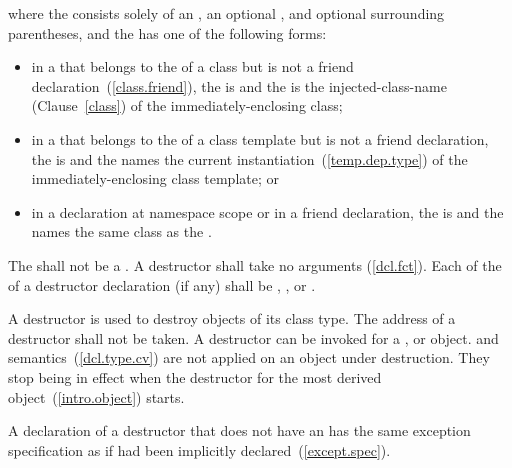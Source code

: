 where the  consists solely of an
, an optional ,
and optional surrounding parentheses, and the  has
one of the following forms:

\begin{itemize}
\item
in a  that belongs to the
 of a class but is not a friend
declaration~(\ref{class.friend}), the  is
\tcode{\~} and the  is the
injected-class-name (Clause~\ref{class}) of the immediately-enclosing class;

\item
in a  that belongs to the
 of a class template but is not a friend
declaration, the  is
\tcode{\~} and the  names the
current instantiation~(\ref{temp.dep.type}) of the immediately-enclosing class template; or

\item
in a declaration at namespace scope or in a friend declaration, the
 is 
\tcode{\~} and the  names the
same class as the .
\end{itemize}

The  shall not be a . A
destructor shall take no arguments (\ref{dcl.fct}).
Each  of the 
of a destructor declaration (if any) shall be , , or
.

\pnum
A destructor is used to destroy objects of its class type.
%
The address of a destructor shall not be taken.
%
%
A destructor can be invoked for a
,
or
object.
and
semantics~(\ref{dcl.type.cv}) are not applied on an object under destruction.
They stop being in effect when the destructor for the
most derived object~(\ref{intro.object}) starts.

\pnum
A declaration of a destructor that does not have an 
has the same exception specification as if had been implicitly declared~(\ref{except.spec}).

